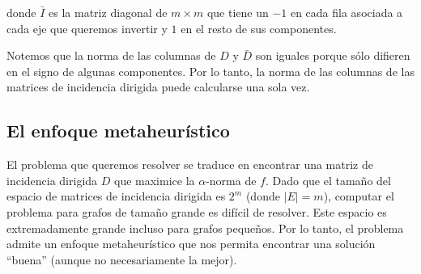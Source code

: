 \documentclass[conference,compsoc,a4paper]{IEEEtran}
\begin{document}
\smallskip

\noindent donde $\bar{I}$ es la matriz diagonal de $m \times m$ que tiene un $-1$ 
en cada fila asociada a cada eje que queremos invertir y $1$ en el resto 
de sus componentes.

\smallskip

Notemos que la norma de las columnas de $D$ y $\bar{D}$ son iguales 
porque sólo difieren en el signo de algunas componentes. Por lo tanto, 
la norma de las columnas de las matrices de incidencia dirigida puede 
calcularse una sola vez. 

%
%

\bigskip

\subsection{El enfoque metaheurístico}

El problema que queremos resolver se traduce en encontrar una matriz de 
incidencia dirigida $D$ que maximice la $\alpha$-norma de $f$. 
Dado que el tamaño del espacio de matrices de 
incidencia dirigida es $2^m$  (donde $|E|=m$), computar el problema
para grafos de tamaño grande es difícil de resolver. 
Este espacio es 
extremadamente grande incluso para grafos pequeños. Por lo tanto, el 
problema admite un enfoque metaheurístico que nos permita encontrar 
una solución ``buena'' (aunque no necesariamente la mejor).
\end{document}
